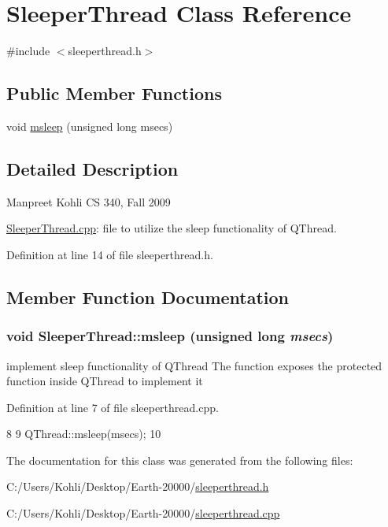 \hypertarget{class_sleeper_thread}{
\section{SleeperThread Class Reference}
\label{class_sleeper_thread}
}


{\ttfamily \#include $<$sleeperthread.h$>$}\subsection*{Public Member Functions}
\begin{DoxyCompactItemize}
\item 
void \hyperlink{class_sleeper_thread_a437d8fa09d1cbc68c78bae1ffbd9b8c5}{msleep} (unsigned long msecs)
\end{DoxyCompactItemize}


\subsection{Detailed Description}
Manpreet Kohli CS 340, Fall 2009

\hyperlink{sleeperthread_8cpp}{SleeperThread.cpp}: file to utilize the sleep functionality of QThread. 

Definition at line 14 of file sleeperthread.h.

\subsection{Member Function Documentation}
\hypertarget{class_sleeper_thread_a437d8fa09d1cbc68c78bae1ffbd9b8c5}{
\subsubsection[{msleep}]{\setlength{\rightskip}{0pt plus 5cm}void SleeperThread::msleep (unsigned long {\em msecs})}}
\label{class_sleeper_thread_a437d8fa09d1cbc68c78bae1ffbd9b8c5}
implement sleep functionality of QThread The function exposes the protected function inside QThread to implement it 

Definition at line 7 of file sleeperthread.cpp.


\begin{DoxyCode}
8 {
9     QThread::msleep(msecs);
10 }
\end{DoxyCode}


The documentation for this class was generated from the following files:\begin{DoxyCompactItemize}
\item 
C:/Users/Kohli/Desktop/Earth-\/20000/\hyperlink{sleeperthread_8h}{sleeperthread.h}\item 
C:/Users/Kohli/Desktop/Earth-\/20000/\hyperlink{sleeperthread_8cpp}{sleeperthread.cpp}\end{DoxyCompactItemize}
